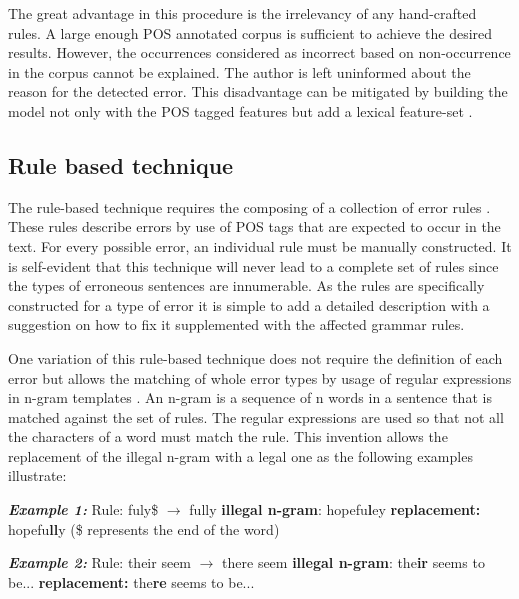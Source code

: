 \documentclass[runningheads]{llncs}
\begin{document}
The great advantage in this procedure is the irrelevancy of any hand-crafted rules. A large enough POS annotated corpus is sufficient to achieve the desired results. However, the occurrences considered as incorrect based on non-occurrence in the corpus cannot be explained. The author is left uninformed about the reason for the detected error. This disadvantage can be mitigated by building the model not only with the POS tagged features but add a lexical feature-set \citep{gamon_using_2009}.

\subsection{Rule based technique}
The rule-based technique requires the composing of a collection of error rules \citep{manchanda_various_2016}. These rules describe errors by use of POS tags that are expected to occur in the text. For every possible error, an individual rule must be manually constructed. It is self-evident that this technique will never lead to a complete set of rules since the types of erroneous sentences are innumerable. As the rules are specifically constructed for a type of error it is simple to add a detailed description with a suggestion on how to fix it supplemented with the affected grammar rules.

One variation of this rule-based technique does not require the definition of each error but allows the matching of whole error types by usage of regular expressions in n-gram templates \citep{kantrowitz_method_2003}. An n-gram is a sequence of n words in a sentence that is matched against the set of rules. The regular expressions are used so that not all the characters of a word must match the rule. This invention allows the replacement of the illegal n-gram with a legal one as the following examples illustrate:

\textbf{\textit{Example 1:}}
\newline Rule: fuly\$ $\rightarrow$ fully
\newline\textbf{illegal n-gram}: hopefu\textbf{l}ey
\newline\textbf{replacement:} hopefu\textbf{ll}y
\newline(\$ represents the end of the word)

\textbf{\textit{Example 2:}}
\newline Rule: their seem $\rightarrow$ there seem
\newline\textbf{illegal n-gram}: the\textbf{ir} seems to be...
\newline\textbf{replacement:} the\textbf{re} seems to be...
\end{document}
